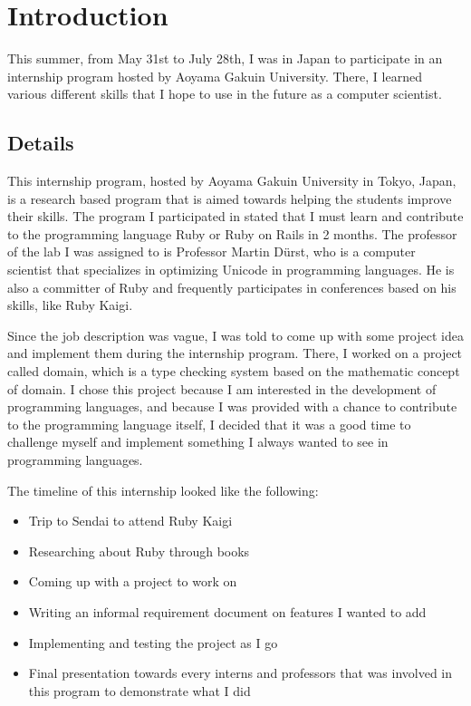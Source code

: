 \section{Introduction}

This summer, from May 31st to July 28th, I was in Japan to participate in an internship program hosted by Aoyama Gakuin University.  There, I learned various different skills that I hope to use in the future as a computer scientist.

\subsection{Details}

This internship program, hosted by Aoyama Gakuin University in Tokyo, Japan, is a research based program that is aimed towards helping the students improve their skills.  The program I participated in stated that I must learn and contribute to the programming language Ruby or Ruby on Rails in 2 months.  The professor of the lab I was assigned to is Professor Martin D\"{u}rst, who is a computer scientist that specializes in optimizing Unicode in programming languages.  He is also a committer of Ruby and frequently participates in conferences based on his skills, like Ruby Kaigi.  

Since the job description was vague, I was told to come up with some project idea and implement them during the internship program.  There, I worked on a project called domain, which is a type checking system based on the mathematic concept of domain.  I chose this project because I am interested in the development of programming languages, and because I was provided with a chance to contribute to the programming language itself, I decided that it was a good time to challenge myself and implement something I always wanted to see in programming languages.

The timeline of this internship looked like the following:

\begin{itemize}[noitemsep]
\item Trip to Sendai to attend Ruby Kaigi
\item Researching about Ruby through books
\item Coming up with a project to work on
\item Writing an informal requirement document on features I wanted to add
\item Implementing and testing the project as I go
\item Final presentation towards every interns and professors that was involved in this program to demonstrate what I did
\end{itemize}

